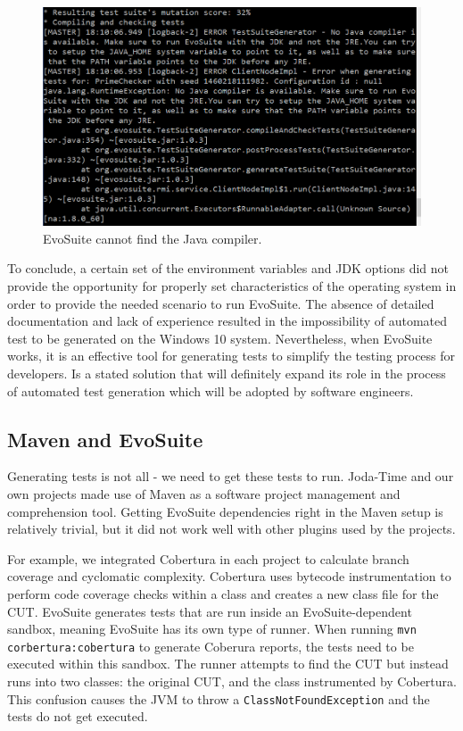 \begin{figure}
\centering
        \includegraphics[width=.65\textwidth]{Usability/Error_Evosuite.png}
    \caption{EvoSuite cannot find the Java compiler.}
    \label{fig:error}
    \vspace{.5cm}
\end{figure}

To conclude, a certain set of the environment variables and JDK options did not provide the opportunity for properly set characteristics of the operating system in order to provide the needed scenario to run EvoSuite. 
The absence of detailed documentation and lack of experience resulted in the impossibility of automated test to be generated on the Windows 10 system. 
Nevertheless, when EvoSuite works, it is an effective tool for generating tests to simplify the testing process for developers.
Is a stated solution that will definitely expand its role in the process of automated test generation which will be adopted by software engineers.

\subsection{Maven and EvoSuite}

Generating tests is not all - we need to get these tests to run.
Joda-Time and our own projects made use of Maven as a software project management and comprehension tool. 
Getting EvoSuite dependencies right in the Maven setup is relatively trivial, but it did not work well with other plugins used by the projects.

For example, we integrated Cobertura in each project to calculate branch coverage and cyclomatic complexity. 
Cobertura uses bytecode instrumentation to perform code coverage checks within a class and creates a new class file for the CUT. 
EvoSuite generates tests that are run inside an EvoSuite-dependent sandbox, meaning EvoSuite has its own type of runner. 
When running \verb|mvn corbertura:cobertura| to generate Coberura reports, the tests need to be executed within this sandbox.
The runner attempts to find the CUT but instead runs into two classes: the original CUT, and the class instrumented by Cobertura. 
This confusion causes the JVM to throw a \verb|ClassNotFoundException| and the tests do not get executed. 

